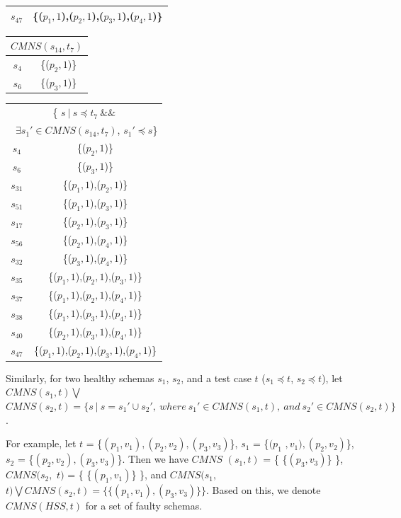 {\begin{table}[htbp]
\begin{tabular}{|c|c|}
   $s_{47}$ & \{($p_{1}, 1$),($p_{2}, 1$),($p_{3}, 1$),($p_{4}, 1$)\} \\
   \hline
    \end{tabular}%
\quad
    \begin{tabular}{|c|c|} \hline
     \multicolumn{2}{|c|}{$CMNS(s_{14}, t_{7})$} \\ \hline
   $s_{4}$ & \{($p_{2}, 1$)\} \\
   $s_{6}$ & \{($p_{3}, 1$)\} \\
    \hline
    \end{tabular}%
\quad
    \begin{tabular}{|c|c|} \hline
   \multicolumn{2}{|c|}{ \{ $ s\ |\ s \preceq t_{7}\ \&\& $ }\\
   \multicolumn{2}{|c|}{\ $\exists s_{1}' \in CMNS(s_{14}, t_{7})$, $s_{1}' \preceq s$\}}\\
    \hline
   $s_{4}$ & \{($p_{2}, 1$)\} \\
   $s_{6}$ & \{($p_{3}, 1$)\} \\

   $s_{31}$ & \{($p_{1}, 1$),($p_{2}, 1$)\} \\
   $s_{51}$ & \{($p_{1}, 1$),($p_{3}, 1$)\} \\
   $s_{17}$ & \{($p_{2}, 1$),($p_{3}, 1$)\} \\
   $s_{56}$ & \{($p_{2}, 1$),($p_{4}, 1$)\} \\
   $s_{32}$ & \{($p_{3}, 1$),($p_{4}, 1$)\} \\

   $s_{35}$ & \{($p_{1}, 1$),($p_{2}, 1$),($p_{3}, 1$)\} \\
   $s_{37}$ & \{($p_{1}, 1$),($p_{2}, 1$),($p_{4}, 1$)\} \\
   $s_{38}$ & \{($p_{1}, 1$),($p_{3}, 1$),($p_{4}, 1$)\} \\
   $s_{40}$ & \{($p_{2}, 1$),($p_{3}, 1$),($p_{4}, 1$)\} \\

   $s_{47}$ & \{($p_{1}, 1$),($p_{2}, 1$),($p_{3}, 1$),($p_{4}, 1$)\} \\
   \hline
    \end{tabular}%
\end{table}


Similarly, for two healthy schemas $s_{1}$, $s_{2}$, and a test case $t$ ($s_{1} \preceq t$, $s_{2} \preceq t$), let $CMNS(s_{1}, t) \bigvee $ $CMNS(s_{2}, t)  = \{ s\ |\ s = s_{1}' \cup s_{2}',\ where\ s_{1}' \in CMNS(s_{1}, t),\ and\ s_{2}' \in CMNS(s_{2}, t) \}$.

For example, let $t$ = \{$(p_{1},v_{1}), (p_{2}, v_{2}), (p_{3}, v_{3})$\}, $s_{1}$ = \{$(p_{1}$ $, v_{1}), (p_{2}, v_{2})$\}, $s_{2}$ = \{$(p_{2}, v_{2}), (p_{3}, v_{3})$\}. Then we have $CMNS$ $(s_{1}, t)$ = \{ \{$(p_{3}, v_{3})$\} \}, $CMNS(s_{2},$ $ t)$ = \{ \{$(p_{1}, v_{1})$\} \}, and  $CMNS(s_{1},$ $ t) \bigvee CMNS(s_{2}, t) = \{ \{(p_{1}, v_{1}), (p_{3}, v_{3})\} \} $. Based on this, we denote $CMNS(HSS,t)$ for a set of faulty schemas.


}
